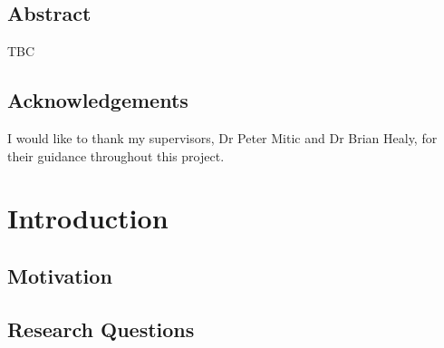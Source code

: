 \documentclass[11pt,a4paper,oneside]{book}
\newif\ifshowdraftnotes
\newcommand{\draftnote}[1]{%
  \ifshowdraftnotes
    \par\smallskip
    \noindent{\color{draftgrey}\small\itshape Drafting note: #1\par}
    \smallskip
  \fi
}
\begin{document}
\section*{Abstract}

TBC

\draftnote{Three short parts per the programme guidance: what the study is about and why it is hard; what was done (panel, nine rules, direct conditional test, chronological split, cost accounting, risk translation); the main results (negative-story share as the only corrected survivor and a conditional coefficient of $-0.00831$ with 95\% interval $[-0.01410,-0.00252]$, the cost no-go, the downside-timing evidence and the failed LSEG portability/zero-activation transfer). No unintroduced acronyms.}

\newpage

\section*{Acknowledgements}

I would like to thank my supervisors, Dr Peter Mitic and Dr Brian Healy, for their guidance throughout this project.

\newpage

\setcounter{tocdepth}{2}
\cleardoublepage
\tableofcontents
\cleardoublepage
\listoffigures
\cleardoublepage
\listoftables

\mainmatter

\chapter{Introduction}
\label{ch:introduction}

\section{Motivation}
\label{sec:motivation}

\draftnote{Open from the aggregation problem: on most trading days a covered company appears in more than one story, and the standard pipeline scores each story and takes the average. Two firm-days can share a mean while one is uniformly mild and the other mixes strong positives with strong negatives. The question is whether the shape of the day's scores carries information the mean throws away, and whether any of it survives realistic costs.}

\section{Research Questions}
\label{sec:research-questions}
\end{document}
